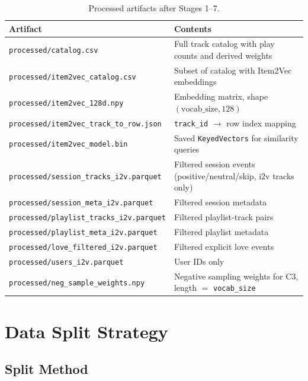 \documentclass[11pt]{article}
\begin{document}
\begin{table}[H]
\centering
\caption{Processed artifacts after Stages 1--7.}
\begin{tabular}{ll}
\toprule
\textbf{Artifact} & \textbf{Contents} \\
\midrule
\texttt{processed/catalog.csv} &
  Full track catalog with play counts and derived weights \\
\texttt{processed/item2vec\_catalog.csv} &
  Subset of catalog with Item2Vec embeddings  \\
\texttt{processed/item2vec\_128d.npy} &
  Embedding matrix, shape $(\text{vocab\_size}, 128)$ \\
\texttt{processed/item2vec\_track\_to\_row.json} &
  \texttt{track\_id} $\to$ row index mapping \\
\texttt{processed/item2vec\_model.bin} &
  Saved \texttt{KeyedVectors} for similarity queries \\
\texttt{processed/session\_tracks\_i2v.parquet} &
  Filtered session events (positive/neutral/skip, i2v tracks only) \\
\texttt{processed/session\_meta\_i2v.parquet} &
  Filtered session metadata \\
\texttt{processed/playlist\_tracks\_i2v.parquet} &
  Filtered playlist-track pairs \\
\texttt{processed/playlist\_meta\_i2v.parquet} &
  Filtered playlist metadata \\
\texttt{processed/love\_filtered\_i2v.parquet} &
  Filtered explicit love events \\
\texttt{processed/users\_i2v.parquet} &
  User IDs only \\
\texttt{processed/neg\_sample\_weights.npy} &
  Negative sampling weights for C3, length $=$ \texttt{vocab\_size} \\
\bottomrule
\end{tabular}
\end{table}

\section{Data Split Strategy}
\label{sec:split}

\subsection{Split Method}
\end{document}
